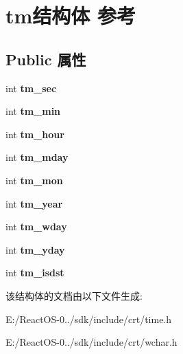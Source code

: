 \hypertarget{structtm}{}\section{tm结构体 参考}
\label{structtm}
\subsection*{Public 属性}
\begin{DoxyCompactItemize}
\item 
\mbox{\label{structtm_a4d098a9a5c03a00b2ee61e10851de81e}} 
int {\bfseries tm\+\_\+sec}
\item 
\mbox{\label{structtm_af414eb7c86cc3099595211eee4d4211b}} 
int {\bfseries tm\+\_\+min}
\item 
\mbox{\label{structtm_a3e7ca4e37f1abcaf56b8a916c38eb9fe}} 
int {\bfseries tm\+\_\+hour}
\item 
\mbox{\label{structtm_ab8d8904bad43b0c8b96e61941c5b5310}} 
int {\bfseries tm\+\_\+mday}
\item 
\mbox{\label{structtm_a112ac36fa2f593777138a417cf031e17}} 
int {\bfseries tm\+\_\+mon}
\item 
\mbox{\label{structtm_a33adf78fd6476b2120ce3b9c4a852053}} 
int {\bfseries tm\+\_\+year}
\item 
\mbox{\label{structtm_afe81a8c46f1c693c43f259b288859f4f}} 
int {\bfseries tm\+\_\+wday}
\item 
\mbox{\label{structtm_a93a0ba77cc23796df84405dcbcc57eb1}} 
int {\bfseries tm\+\_\+yday}
\item 
\mbox{\label{structtm_a5645ca0580c8ab2c24f6c2965d9c9f9c}} 
int {\bfseries tm\+\_\+isdst}
\end{DoxyCompactItemize}


该结构体的文档由以下文件生成\+:\begin{DoxyCompactItemize}
\item 
E\+:/\+React\+O\+S-\/0../sdk/include/crt/time.\+h\item 
E\+:/\+React\+O\+S-\/0../sdk/include/crt/wchar.\+h\end{DoxyCompactItemize}
